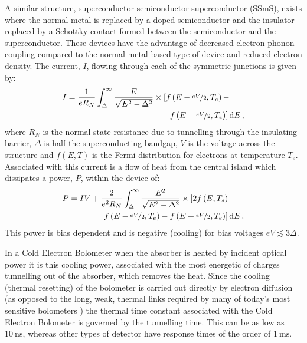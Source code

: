 \documentclass[aip, apl, a4paper, amsmath,amssymb, reprint]{revtex4-1}
\begin{document}
A similar structure, superconductor-semiconductor-superconductor (SSmS), exists where the normal metal is replaced by a doped semiconductor and the insulator replaced by a Schottky contact formed between the semiconductor and the superconductor\cite{Savin01}. These devices have the advantage of decreased electron-phonon coupling compared to the normal metal based type of device\cite{Muhonen2011} and reduced electron density. The current, $I$, flowing through each of the symmetric junctions is given by:
\begin{align}
I &=\frac{1}{eR_{N}}\int_{\Delta}^{\infty} \frac{E}{\sqrt{E^{2}-\Delta^{2}}}  \times \left[f\left(E-\nicefrac{eV}{2},T_{e}\right) - \right. \nonumber \\
&\qquad \qquad \qquad \qquad \qquad \qquad  \; \left. f\left(E+\nicefrac{eV}{2},T_{e}\right)\right] \mathrm{d}E\, , \label{eq:IV}
\end{align}
where $R_{N}$ is the normal-state resistance due to tunnelling through the insulating barrier, $\Delta$ is half the superconducting bandgap, $V$ is the  voltage across the structure and  $f\left(E,T\right)$ is the Fermi distribution for electrons at temperature $T_{e}$. Associated with this current is a flow of heat from the central island which dissipates a power, $P$, within the device of:
\begin{align}
P &= IV + \frac{2}{e^{2}R_{N}}\int_{\Delta}^{\infty} \frac{E^{2}}{\sqrt{E^{2}-\Delta^{2}}} \times \left[2f\left(E,T_{s}\right) - \right. \nonumber \\ 
&\qquad \qquad  \left. f\left(E-\nicefrac{eV}{2},T_{e}\right)- f\left(E+\nicefrac{eV}{2}, T_{e}\right)\right] \mathrm{d}E\, \label{eqn:Pc}.
\end{align}
This power is bias dependent and is negative (cooling) for bias voltages $eV \lesssim 3\Delta$.

In a Cold Electron Bolometer when the absorber is heated by incident optical power it is this cooling power, associated with the most energetic of charges tunnelling out of the absorber, which removes the heat. Since the cooling (thermal resetting) of the bolometer is carried out directly by electron diffusion (as opposed to the long, weak, thermal links required by many of today's most sensitive bolometers \cite{Mauskopf97, Audley12, Holland13}) the thermal time constant associated with the Cold Electron Bolometer is governed by the tunnelling time. This can be \cite{Kuzmin04} as low as $10~\mathrm{ns}$, whereas other types of detector \cite{Jackson12} have response times of the order of $1~\mathrm{ms}$.
\end{document}
